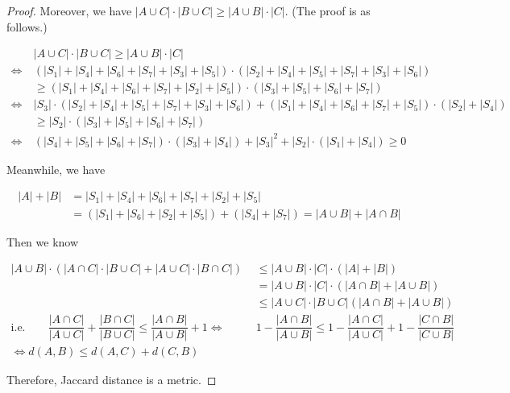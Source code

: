 \documentclass{article}
\begin{document}
\begin{proof}
    \hspace{1.3em}
    Moreover, we have $|A\cup C|\cdot|B\cup C|\geq |A\cup B|\cdot|C|$. (The proof is as follows.)

    \vspace{-3em}
    \begin{align*}
        &|A\cup C|\cdot|B\cup C|\geq |A\cup B|\cdot|C|\\
        \Longleftrightarrow\ &\left(|S_1|+|S_4|+|S_6|+|S_7|+|S_3|+|S_5|\right)\cdot\left(|S_2|+|S_4|+|S_5|+|S_7|+|S_3|+|S_6|\right)\\
        & \geq \left(|S_1|+|S_4|+|S_6|+|S_7|+|S_2|+|S_5|\right)\cdot\left(|S_3|+|S_5|+|S_6|+|S_7|\right)\\
        \Longleftrightarrow\ & |S_3|\cdot\left(|S_2|+|S_4|+|S_5|+|S_7|+|S_3|+|S_6|\right) + \left(|S_1|+|S_4|+|S_6|+|S_7|+|S_5|\right)\cdot\left(|S_2|+|S_4|\right)\\
        &\geq |S_2|\cdot\left(|S_3|+|S_5|+|S_6|+|S_7|\right) \\
        \Longleftrightarrow\ & \left(|S_4|+|S_5|+|S_6|+|S_7|\right)\cdot\left(|S_3|+|S_4|\right) + |S_3|^2 + |S_2|\cdot\left(|S_1|+|S_4|\right) \geq 0
    \end{align*}

    \hspace{1.3em}
    Meanwhile, we have

    \vspace{-3em}
    \begin{align*}
        |A|+|B| &= |S_1|+|S_4|+|S_6|+|S_7|+|S_2|+|S_5| \\
        & = (|S_1|+|S_6|+|S_2|+|S_5|) + (|S_4|+|S_7|) = |A\cup B|+|A\cap B|
    \end{align*}

    \vspace{-0.75em} \hspace{1.3em}
    Then we know
    
    \vspace{-3em}
    \begin{align*}
        |A\cup B|\cdot\left(|A\cap C|\cdot|B\cup C|+|A\cup C|\cdot|B\cap C|\right) &\le |A\cup B|\cdot|C|\cdot\left(|A|+|B|\right) \\
        & = |A\cup B|\cdot|C|\cdot\left(|A\cap B|+|A\cup B|\right)  \\
        & \le |A\cup C|\cdot|B\cup C|\left(|A\cap B|+|A\cup B|\right) \\
        \text{i.e.}\qquad \dfrac{|A\cap C|}{|A\cup C|}+\dfrac{|B\cap C|}{|B\cup C|}\le \dfrac{|A\cap B|}{|A\cup B|}+1 \Longleftrightarrow & 1- \dfrac{|A\cap B|}{|A\cup B|} \le 1-\dfrac{|A\cap C|}{|A\cup C|}+1-\dfrac{|C\cap B|}{|C\cup B|} \\
        \Longleftrightarrow d(A,B)\le d(A,C)+d(C,B) \qquad \qquad\ 
   \end{align*}

   \vspace{-0.25em} \hspace{1.3em}
   Therefore, Jaccard distance is a metric.
\end{proof}
\end{document}
